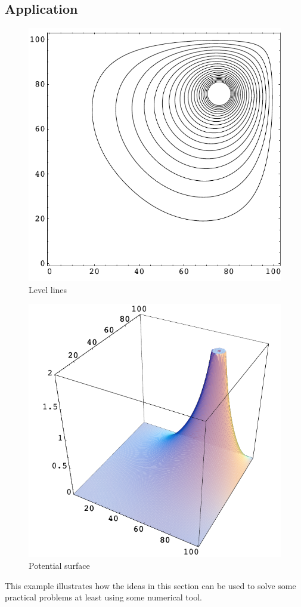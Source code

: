 \subsection{Application}
\begin{figure}
\begin{center}
\includegraphics[width=0.8\hsize]{../common/graphics/neilcontour}
\end{center}
\caption{Level lines\label{neilcontour}}
\end{figure}
\begin{figure}
\begin{center}
\includegraphics[width=0.8\hsize]{../common/graphics/neilloesung}
\end{center}
\caption{Potential surface\label{neilloesung}}
\end{figure}
This example illustrates how the ideas in this section can be used
to solve some practical problems at least using some numerical tool.

